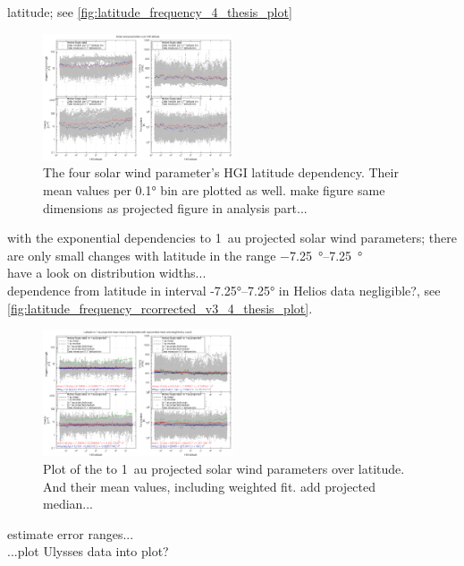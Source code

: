 latitude; see \autoref{fig:latitude_frequency_4_thesis_plot}
\begin{figure}[htb]
	\centering
	\includegraphics[width=0.5\textwidth]{images/gnuplots/latitude_frequency_4_thesis_plot.png}
	\caption{The four solar wind parameter's HGI latitude dependency. Their mean values per 0.1° bin are plotted as well. make figure same dimensions as projected figure in analysis part...}
	\label{fig:latitude_frequency_4_thesis_plot}
\end{figure}

with the exponential dependencies to 1~au projected solar wind parameters; there are only small changes with latitude in the range \SIrange{-7.25}{7.25}{\degree}\\
have a look on distribution widths...\\

dependence from latitude in interval -7.25°--7.25° in Helios data negligible?, see \autoref{fig:latitude_frequency_rcorrected_v3_4_thesis_plot}.
\begin{figure}[htb]
	\centering
	\includegraphics[width=0.5\textwidth]{images/gnuplots/latitude_frequency_rcorrected_v3_4_thesis_plot.png}
	\caption{Plot of the to 1~au projected solar wind parameters over latitude. And their mean values, including weighted fit. add projected median...}
	\label{fig:latitude_frequency_rcorrected_v3_4_thesis_plot}
\end{figure}
estimate error ranges...\\

...plot Ulysses data into plot?\\

